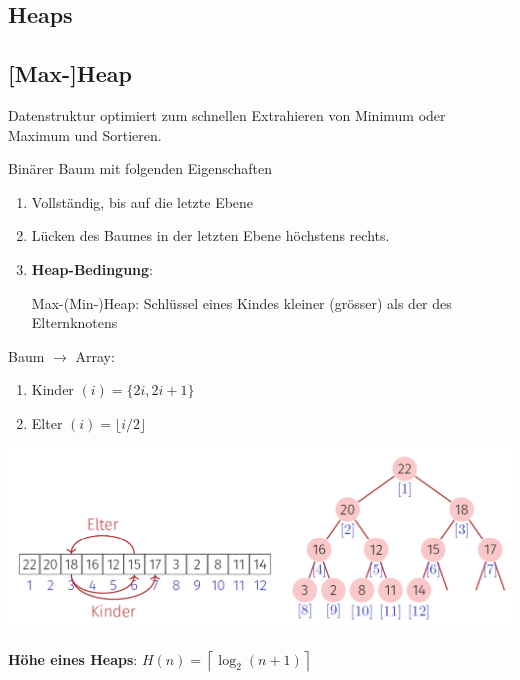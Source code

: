 \vspace{-4pt}
\begin{sectionbox}
\section{Heaps}
\subsection{[Max-]Heap}\smallskip
Datenstruktur optimiert zum schnellen Extrahieren von Minimum oder Maximum und Sortieren.\par\smallskip

Binärer Baum mit folgenden Eigenschaften\par
\begin{enumerate}
    \item Vollständig, bis auf die letzte Ebene
    \item Lücken des Baumes in der letzten Ebene höchstens rechts.
    \item \textbf{Heap-Bedingung}:
    \par Max-(Min-)Heap: Schlüssel eines Kindes kleiner (grösser) als der des Elternknotens
\end{enumerate}\smallskip

Baum $\rightarrow$ Array:
\begin{enumerate}
    \item Kinder $(i)=\{2 i, 2 i+1\}$
    \item Elter $(i)=\lfloor i / 2\rfloor$
\end{enumerate}\smallskip

\includegraphics[width = \columnwidth]{../img/heaps.png}\smallskip

\textbf{Höhe eines Heaps}: $H(n)=\left\lceil\log _{2}(n+1)\right\rceil$\par\smallskip

\end{sectionbox}

